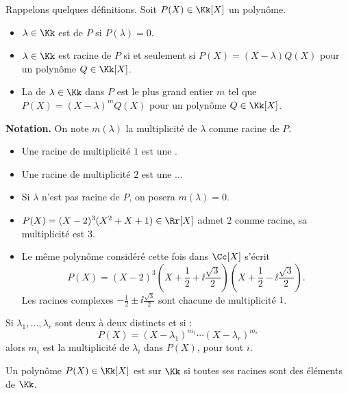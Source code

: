 \documentclass[12pt, class=report,crop=false]{standalone}
\begin{document}
Rappelons quelques définitions.
Soit $P(X) \in \Kk[X]$ un polynôme.
\begin{itemize}
  \item $\lambda \in \Kk$ est  de $P$ si $P(\lambda)=0$.
  \item $\lambda \in \Kk$ est racine de $P$ si et seulement si $P(X) = (X-\lambda) Q(X)$ pour un polynôme $Q \in \Kk[X]$.
  \item La  de $\lambda \in \Kk$ dans $P$ est le plus grand entier $m$ tel que 
  $P(X) = (X-\lambda)^m Q(X)$ pour un polynôme $Q \in \Kk[X]$.
\end{itemize}


\textbf{Notation.}  On note $m(\lambda)$ la multiplicité de $\lambda$ comme racine de $P$.

\begin{itemize}

  \item Une racine de multiplicité $1$ est une .
  \item Une racine de multiplicité $2$ est une ...    
  \item Si $\lambda$ n'est pas racine de $P$, on posera $m(\lambda)=0$.
  
\end{itemize}  
  
  
\begin{exemple}
\sauteligne
\begin{itemize}
  \item $P(X) = (X-2)^3(X^2+X+1) \in \Rr[X]$ admet $2$ comme racine, sa multiplicité est $3$.
  \item Le même polynôme considéré cette fois dans $\Cc[X]$ s'écrit 
  $$P(X) = (X-2)^3 (X+\frac12+\ii\frac{\sqrt{3}}{2})(X+\frac12-\ii\frac{\sqrt{3}}{2}).$$
  Les racines complexes $-\frac12\pm\ii\frac{\sqrt{3}}{2}$ sont chacune de multiplicité $1$.
\end{itemize}
\end{exemple}

\begin{exemple}
Si $\lambda_1,\ldots,\lambda_r$ sont deux à deux distincts et si :
\[P(X) =(X-\lambda_1)^{m_1}\cdots(X-\lambda_r)^{m_r}\]
alors $m_i$ est la multiplicité de $\lambda_i$ dans $P(X)$, pour tout $i$. 
\end{exemple}



\begin{definition}
Un polynôme $P(X) \in \Kk[X]$ est  sur $\Kk$ si 
toutes ses racines sont des éléments de $\Kk$.
\end{definition}
\end{document}
